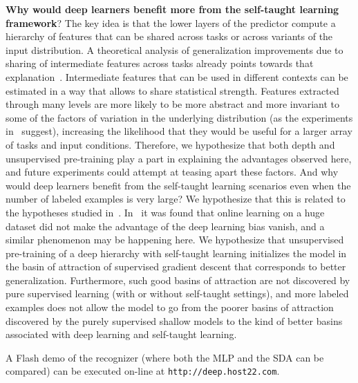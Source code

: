 \documentclass{article} %
\begin{document}
{\bf Why would deep learners benefit more from the self-taught learning framework}?
The key idea is that the lower layers of the predictor compute a hierarchy
of features that can be shared across tasks or across variants of the
input distribution. A theoretical analysis of generalization improvements
due to sharing of intermediate features across tasks already points
towards that explanation~\cite{baxter95a}.
Intermediate features that can be used in different
contexts can be estimated in a way that allows to share statistical 
strength. Features extracted through many levels are more likely to
be more abstract and more invariant to some of the factors of variation
in the underlying distribution (as the experiments in~\citet{Goodfellow2009} suggest),
increasing the likelihood that they would be useful for a larger array
of tasks and input conditions.
Therefore, we hypothesize that both depth and unsupervised
pre-training play a part in explaining the advantages observed here, and future
experiments could attempt at teasing apart these factors.
And why would deep learners benefit from the self-taught learning
scenarios even when the number of labeled examples is very large?
We hypothesize that this is related to the hypotheses studied
in~\citet{Erhan+al-2010}. In~\citet{Erhan+al-2010}
it was found that online learning on a huge dataset did not make the
advantage of the deep learning bias vanish, and a similar phenomenon
may be happening here. We hypothesize that unsupervised pre-training
of a deep hierarchy with self-taught learning initializes the
model in the basin of attraction of supervised gradient descent
that corresponds to better generalization. Furthermore, such good
basins of attraction are not discovered by pure supervised learning
(with or without self-taught settings), and more labeled examples
does not allow the model to go from the poorer basins of attraction discovered
by the purely supervised shallow models to the kind of better basins associated
with deep learning and self-taught learning.

A Flash demo of the recognizer (where both the MLP and the SDA can be compared) 
can be executed on-line at {\tt http://deep.host22.com}.

{

%

%
}
\end{document}
